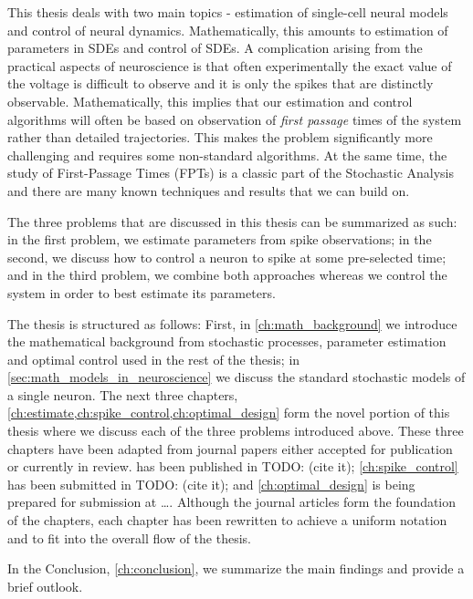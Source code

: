 \documentclass{report}
\begin{document}
This thesis deals with two main topics - estimation of single-cell neural models
and control of neural dynamics. Mathematically, this amounts to estimation of
parameters in SDEs and control of SDEs. A complication arising from the
practical aspects of neuroscience is that often experimentally the exact value
of the voltage is difficult to observe and it is only the spikes that are
distinctly observable. Mathematically, this implies that our estimation
and control algorithms will often be based on observation of {\sl first
passage} times of the system rather than detailed trajectories. This makes the problem
significantly more challenging and requires some non-standard
algorithms. At the same time, the study of First-Passage Times (FPTs) is a
classic part of the Stochastic Analysis and there are many known
techniques and results that we can build on.

The three problems that are discussed in this thesis can be summarized as
such: in the first problem, we estimate parameters from spike observations; 
in the second, we discuss how to control a neuron to spike at some pre-selected
time; and in the third problem, we combine both approaches whereas we
control the system in order to best estimate its parameters.

The thesis is structured as follows: First, in \cref{ch:math_background} we
introduce the mathematical background from stochastic processes, parameter
estimation and optimal control used in the rest of the thesis; in
\cref{sec:math_models_in_neuroscience} we discuss the standard stochastic models
of a single neuron. The next three chapters,
\cref{ch:estimate,ch:spike_control,ch:optimal_design} form the novel portion of
this thesis where we discuss each of the three problems introduced above. These
three chapters have been adapted from journal papers either accepted for
publication or currently in review.  has been published in
TODO: (cite it); \cref{ch:spike_control} has been submitted in TODO: (cite it);
and \cref{ch:optimal_design} is being prepared for submission at \ldots.
Although the journal articles form the foundation of the chapters, each chapter
has been rewritten to achieve a uniform notation and to fit into the overall
flow of the thesis.

In the Conclusion, \cref{ch:conclusion}, we summarize the main findings and
provide a brief outlook.


\cleardoublepage

\cleardoublepage
%  

\cleardoublepage

\cleardoublepage

\cleardoublepage
\end{document}
